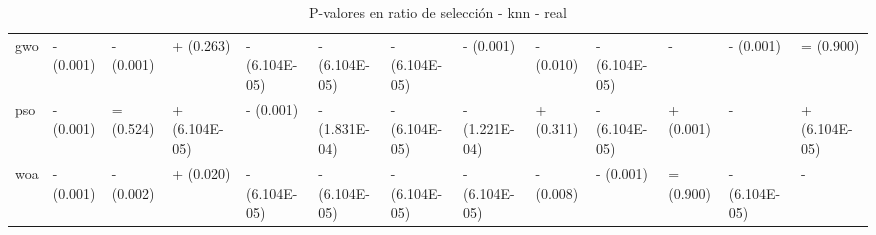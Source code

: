 \begin{table}
\begin{adjustbox}{width=\linewidth}
\begin{tabular}{lllllllllllll}
            gwo   & - (0.001)     & - (0.001)     & + (0.263)     & - (6.104E-05) & - (6.104E-05) & - (6.104E-05) & - (0.001)     & - (0.010)     & - (6.104E-05) & -             & - (0.001)     & = (0.900)     \\
            pso   & - (0.001)     & = (0.524)     & + (6.104E-05) & - (0.001)     & - (1.831E-04) & - (6.104E-05) & - (1.221E-04) & + (0.311)     & - (6.104E-05) & + (0.001)     & -             & + (6.104E-05) \\
            woa   & - (0.001)     & - (0.002)     & + (0.020)     & - (6.104E-05) & - (6.104E-05) & - (6.104E-05) & - (6.104E-05) & - (0.008)     & - (0.001)     & = (0.900)     & - (6.104E-05) & -             \\
            \bottomrule
        \end{tabular}
    \end{adjustbox}
    \caption{P-valores en ratio de selección - knn - real}
    \label{tab:p-values_sel_ratio_real_knn}
\end{table}


